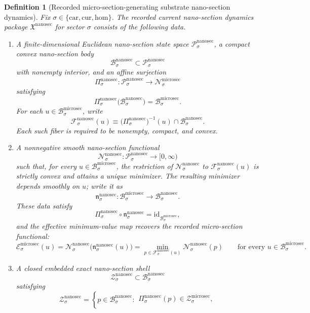 \documentclass[11pt]{article}
\newcommand{\Car}{\mathrm{car}}
\newcommand{\Cur}{\mathrm{cur}}
\newcommand{\Hom}{\mathrm{hom}}
\newcommand{\MicroSectionSpace}[1]{\mathcal N_{#1}^{\mathrm{microsec}}}
\newcommand{\MicroSectionBody}[1]{\mathcal B_{#1}^{\mathrm{microsec}}}
\newcommand{\MicroSectionFunctional}[1]{\mathscr E_{#1}^{\mathrm{microsec}}}
\newcommand{\MicroSectionShell}[1]{\mathcal Z_{#1}^{\mathrm{microsec}}}
\newcommand{\NanoSectionPackage}{\mathfrak X^{\mathrm{nanosec}}}
\newcommand{\NanoSectionSpace}[1]{\mathcal P_{#1}^{\mathrm{nanosec}}}
\newcommand{\NanoSectionBody}[1]{\mathcal B_{#1}^{\mathrm{nanosec}}}
\newcommand{\NanoSectionProj}[1]{\Pi_{#1}^{\mathrm{nanosec}}}
\newcommand{\NanoSectionFiber}[2]{\mathcal F_{#1}^{\mathrm{nanosec}}(#2)}
\newcommand{\NanoSectionMicroMin}[1]{\mathfrak n_{#1}^{\mathrm{nanosec}}}
\newcommand{\NanoSectionFunctional}[1]{\mathscr N_{#1}^{\mathrm{nanosec}}}
\newcommand{\NanoSectionShell}[1]{\mathcal Z_{#1}^{\mathrm{nanosec}}}
\newtheorem{definition}{Definition}
\begin{document}
\begin{definition}[Recorded micro-section-generating substrate nano-section dynamics]
\label{def:nanosec}
Fix \(\sigma\in\{\Car,\Cur,\Hom\}\). The recorded current nano-section dynamics package \(\NanoSectionPackage\) for sector \(\sigma\) consists of the following data.
\begin{enumerate}
    \item A finite-dimensional Euclidean nano-section state space \(\NanoSectionSpace{\sigma}\), a compact convex nano-section body
    \[
    \NanoSectionBody{\sigma}\subset\NanoSectionSpace{\sigma}
    \]
    with nonempty interior, and an affine surjection
    \[
    \NanoSectionProj{\sigma}:\NanoSectionSpace{\sigma}\to\MicroSectionSpace{\sigma}
    \]
    satisfying
    \[
    \NanoSectionProj{\sigma}\bigl(\NanoSectionBody{\sigma}\bigr)=\MicroSectionBody{\sigma}.
    \]
    For each \(u\in\MicroSectionBody{\sigma}\), write
    \[
    \NanoSectionFiber{\sigma}{u}
    \equiv
    \bigl(\NanoSectionProj{\sigma}\bigr)^{-1}(u)\cap\NanoSectionBody{\sigma}.
    \]
    Each such fiber is required to be nonempty, compact, and convex.
    \item A nonnegative smooth nano-section functional
    \[
    \NanoSectionFunctional{\sigma}:\NanoSectionSpace{\sigma}\to[0,\infty)
    \]
    such that, for every \(u\in\MicroSectionBody{\sigma}\), the restriction of \(\NanoSectionFunctional{\sigma}\) to \(\NanoSectionFiber{\sigma}{u}\) is strictly convex and attains a unique minimizer. The resulting minimizer depends smoothly on \(u\); write it as
    \[
    \NanoSectionMicroMin{\sigma}:\MicroSectionBody{\sigma}\to\NanoSectionBody{\sigma}.
    \]
    These data satisfy
    \[
    \NanoSectionProj{\sigma}\circ\NanoSectionMicroMin{\sigma}
    =
    \mathrm{id}_{\MicroSectionBody{\sigma}},
    \]
    and the effective minimum-value map recovers the recorded micro-section functional:
    \[
    \MicroSectionFunctional{\sigma}(u)
    =
    \NanoSectionFunctional{\sigma}\bigl(\NanoSectionMicroMin{\sigma}(u)\bigr)
    =
    \min_{p\in\NanoSectionFiber{\sigma}{u}}
    \NanoSectionFunctional{\sigma}(p)
    \qquad
    \text{for every }
    u\in\MicroSectionBody{\sigma}.
    \]
    \item A closed embedded exact nano-section shell
    \[
    \NanoSectionShell{\sigma}\subset\NanoSectionBody{\sigma}
    \]
    satisfying
    \[
    \NanoSectionShell{\sigma}
    =
    \left\{
    p\in\NanoSectionBody{\sigma}:
    \begin{array}{l}
    \NanoSectionProj{\sigma}(p)\in\MicroSectionShell{\sigma},\\[0.2em]

\end{array}\]
\end{enumerate}
\end{definition}
\end{document}

